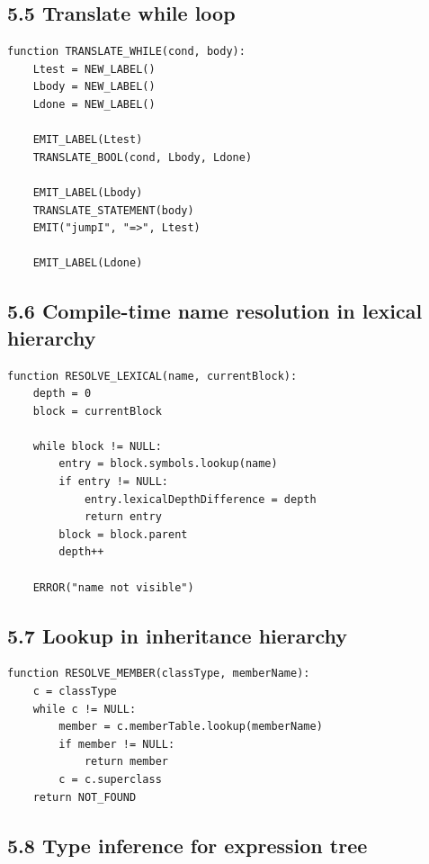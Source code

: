 \documentclass[10pt,letterpaper]{article}
\begin{document}
\subsection*{5.5 Translate while loop}

\begin{verbatim}
function TRANSLATE_WHILE(cond, body):
    Ltest = NEW_LABEL()
    Lbody = NEW_LABEL()
    Ldone = NEW_LABEL()

    EMIT_LABEL(Ltest)
    TRANSLATE_BOOL(cond, Lbody, Ldone)

    EMIT_LABEL(Lbody)
    TRANSLATE_STATEMENT(body)
    EMIT("jumpI", "=>", Ltest)

    EMIT_LABEL(Ldone)
\end{verbatim}

\subsection*{5.6 Compile-time name resolution in lexical hierarchy}

\begin{verbatim}
function RESOLVE_LEXICAL(name, currentBlock):
    depth = 0
    block = currentBlock

    while block != NULL:
        entry = block.symbols.lookup(name)
        if entry != NULL:
            entry.lexicalDepthDifference = depth
            return entry
        block = block.parent
        depth++

    ERROR("name not visible")
\end{verbatim}

\subsection*{5.7 Lookup in inheritance hierarchy}

\begin{verbatim}
function RESOLVE_MEMBER(classType, memberName):
    c = classType
    while c != NULL:
        member = c.memberTable.lookup(memberName)
        if member != NULL:
            return member
        c = c.superclass
    return NOT_FOUND
\end{verbatim}

\subsection*{5.8 Type inference for expression tree}
\end{document}
